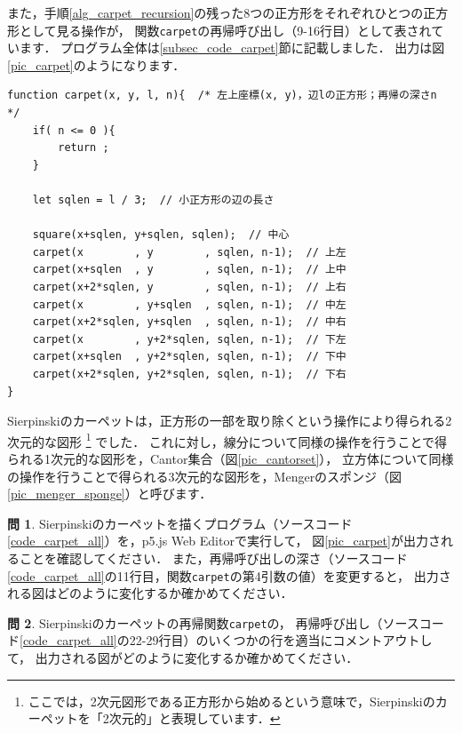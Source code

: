 \documentclass[dvipdfmx]{jsarticle}
\theoremstyle{definition}
\newtheorem{question}{問}[section]
\begin{document}
また，手順\ref{alg_carpet_recursion}の残った8つの正方形をそれぞれひとつの正方形として見る操作が，
関数\verb|carpet|の再帰呼び出し（9-16行目）として表されています．
プログラム全体は\ref{subsec_code_carpet}節に記載しました．
出力は図\ref{pic_carpet}のようになります．
%
\begin{lstlisting}[caption=Sierpinskiのカーペットを描く再帰関数, label=code_carpet]
function carpet(x, y, l, n){  /* 左上座標(x, y)，辺lの正方形；再帰の深さn */
    if( n <= 0 ){
        return ;
    }

    let sqlen = l / 3;  // 小正方形の辺の長さ

    square(x+sqlen, y+sqlen, sqlen);  // 中心
    carpet(x        , y        , sqlen, n-1);  // 上左
    carpet(x+sqlen  , y        , sqlen, n-1);  // 上中
    carpet(x+2*sqlen, y        , sqlen, n-1);  // 上右
    carpet(x        , y+sqlen  , sqlen, n-1);  // 中左
    carpet(x+2*sqlen, y+sqlen  , sqlen, n-1);  // 中右
    carpet(x        , y+2*sqlen, sqlen, n-1);  // 下左
    carpet(x+sqlen  , y+2*sqlen, sqlen, n-1);  // 下中
    carpet(x+2*sqlen, y+2*sqlen, sqlen, n-1);  // 下右
}
\end{lstlisting}

Sierpinskiのカーペットは，正方形の一部を取り除くという操作により得られる2次元的な図形
\footnote{
    ここでは，2次元図形である正方形から始めるという意味で，Sierpinskiのカーペットを「2次元的」と表現しています．
}
でした．
これに対し，線分について同様の操作を行うことで得られる1次元的な図形を，Cantor集合（図\ref{pic_cantorset}），
立方体について同様の操作を行うことで得られる3次元的な図形を，Mengerのスポンジ（図\ref{pic_menger_sponge}）と呼びます．

\begin{question}
    Sierpinskiのカーペットを描くプログラム（ソースコード\ref{code_carpet_all}）を，p5.js Web Editor\cite{p5jseditor}で実行して，
    図\ref{pic_carpet}が出力されることを確認してください．
    また，再帰呼び出しの深さ（ソースコード\ref{code_carpet_all}の11行目，関数\texttt{carpet}の第4引数の値）を変更すると，
    出力される図はどのように変化するか確かめてください．
\end{question}

\begin{question}\label{q_carpet_rec}
    Sierpinskiのカーペットの再帰関数\texttt{carpet}の，
    再帰呼び出し（ソースコード\ref{code_carpet_all}の22-29行目）のいくつかの行を適当にコメントアウトして，
    出力される図がどのように変化するか確かめてください．
\end{question}
\end{document}
